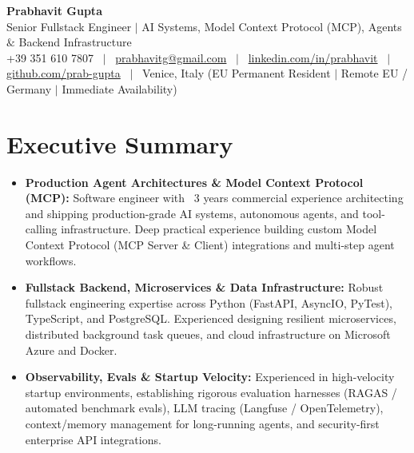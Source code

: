 \documentclass[a4paper,10pt]{article}
\begin{document}
\begin{minipage}[c]{0.80\textwidth}
  {\Huge\bfseries Prabhavit Gupta}\\[3pt]
  {\color{accent}\large Senior Fullstack Engineer $\vert$ AI Systems, Model Context Protocol (MCP), Agents $\&$ Backend Infrastructure}\\[6pt]
  {\footnotesize +39 351 610 7807 ~$\vert$~
  \href{mailto:prabhavitg@gmail.com}{prabhavitg@gmail.com} ~$\vert$~
  \href{https://www.linkedin.com/in/prabhavit/}{linkedin.com/in/prabhavit} ~$\vert$~
  \href{https://github.com/prab-gupta}{github.com/prab-gupta} ~$\vert$~
  Venice, Italy (EU Permanent Resident $\vert$ Remote EU / Germany $\vert$ Immediate Availability)}
\end{minipage}\hfill

\vspace{6pt}

\section{Executive Summary}
\begin{itemize}
  \item \textbf{Production Agent Architectures \& Model Context Protocol (MCP):} Software engineer with ~3 years commercial experience architecting and shipping production-grade AI systems, autonomous agents, and tool-calling infrastructure. Deep practical experience building custom Model Context Protocol (MCP Server \& Client) integrations and multi-step agent workflows.
  \item \textbf{Fullstack Backend, Microservices \& Data Infrastructure:} Robust fullstack engineering expertise across Python (FastAPI, AsyncIO, PyTest), TypeScript, and PostgreSQL. Experienced designing resilient microservices, distributed background task queues, and cloud infrastructure on Microsoft Azure and Docker.
  \item \textbf{Observability, Evals \& Startup Velocity:} Experienced in high-velocity startup environments, establishing rigorous evaluation harnesses (RAGAS / automated benchmark evals), LLM tracing (Langfuse / OpenTelemetry), context/memory management for long-running agents, and security-first enterprise API integrations.
\end{itemize}

\end{document}

